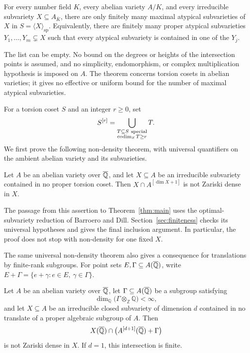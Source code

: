 \begin{theorem}\label{thm:main}
For every number field $K$, every abelian variety $A/K$, and every
irreducible subvariety $X\subseteq A_{\bar K}$, there are only finitely
many maximal atypical subvarieties of $X$ in
$S=\langle X\rangle_{\mathrm{sp}}$. Equivalently, there are finitely many
proper atypical subvarieties $Y_1,\ldots,Y_m\subsetneq X$ such that every
atypical subvariety is contained in one of the $Y_j$.
\end{theorem}

The list can be empty. No bound on the degrees or heights of the
intersection points is assumed, and no simplicity, endomorphism, or
complex multiplication hypothesis is imposed on $A$.
The theorem concerns torsion cosets in abelian varieties; it gives no
effective or uniform bound for the number of maximal atypical
subvarieties.

For a torsion coset $S$ and an integer $r\ge0$, set
\[
 S^{[r]}=\bigcup_{\substack{T\subseteq S\ \mathrm{special}\\
                         \operatorname{codim}_S T\ge r}}T.
\]
We first prove the following non-density theorem, with universal
quantifiers on the ambient abelian variety and its subvarieties.

\begin{theorem}\label{thm:nondensity}
Let $A$ be an abelian variety over $\overline{\mathbb Q}$, and let $X\subseteq A$ be an
irreducible subvariety contained in no proper torsion coset. Then
$X\cap A^{[\dim X+1]}$ is not Zariski dense in $X$.
\end{theorem}

The passage from this assertion to Theorem~\ref{thm:main} uses the
optimal-subvariety reduction of Barroero and Dill. Section~\ref{sec:finiteness}
checks its universal hypotheses and gives the final inclusion argument.
In particular, the proof does not stop with non-density for one fixed
$X$.

The same universal non-density theorem also gives a consequence for
translations by finite-rank subgroups. For point sets
$E,\Gamma\subseteq A(\overline{\mathbb Q})$, write
$E+\Gamma=\{e+\gamma:e\in E,\ \gamma\in\Gamma\}$.

\begin{corollary}
\label{cor:finite-rank-translates}
Let $A$ be an abelian variety over $\overline{\mathbb Q}$, let
$\Gamma\subseteq A(\overline{\mathbb Q})$ be a subgroup satisfying
\[
 \dim_{\mathbb Q}\bigl(\Gamma\otimes_{\mathbb Z}\mathbb Q\bigr)<\infty,
\]
and let $X\subseteq A$ be an irreducible closed subvariety of dimension
$d$ contained in no translate of a proper algebraic subgroup of $A$.
Then
\[
 X(\overline{\mathbb Q})\cap\bigl(A^{[d+1]}(\overline{\mathbb Q})+\Gamma\bigr)
\]
is not Zariski dense in $X$. If $d=1$, this intersection is finite.
\end{corollary}

